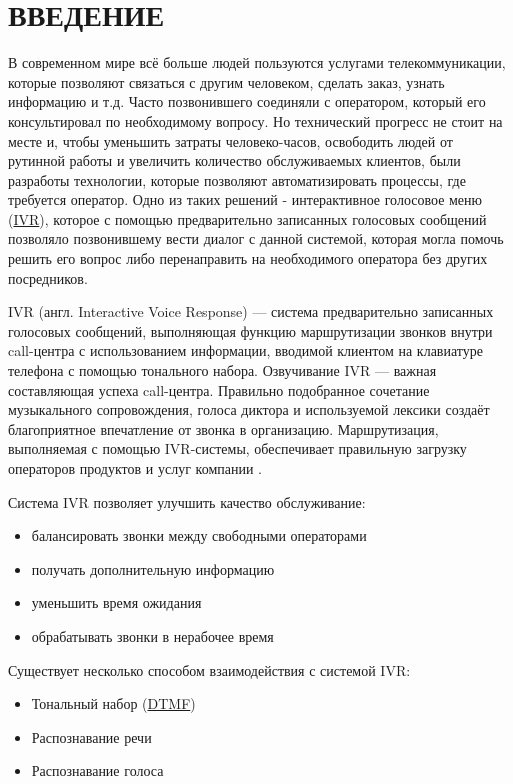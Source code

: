 \chapter{ВВЕДЕНИЕ}

В современном мире всё больше людей пользуются услугами телекоммуникации, которые
позволяют связаться с другим человеком, сделать заказ, узнать информацию и т.д.
Часто позвонившего соединяли с оператором, который его консультировал по необходимому
вопросу. Но технический прогресс не стоит на месте и, чтобы уменьшить
затраты человеко-часов, освободить людей от рутинной работы и увеличить
количество обслуживаемых клиентов, были разработы технологии, которые позволяют
автоматизировать процессы, где требуется оператор. Одно из таких решений - 
интерактивное голосовое меню (\hyperlink{ivr}{IVR}), которое с помощью предварительно записанных голосовых
сообщений позволяло позвонившему вести диалог с данной системой, которая могла
помочь решить его вопрос либо перенаправить на необходимого оператора без других
посредников.

IVR (англ. Interactive Voice Response) — система предварительно записанных
голосовых сообщений, выполняющая функцию маршрутизации звонков внутри call-центра
с использованием информации, вводимой клиентом на клавиатуре телефона с помощью
тонального набора. Озвучивание IVR — важная составляющая успеха call-центра.
Правильно подобранное сочетание музыкального сопровождения, голоса диктора и
используемой лексики создаёт благоприятное впечатление от звонка в организацию.
Маршрутизация, выполняемая с помощью IVR-системы, обеспечивает правильную загрузку
операторов продуктов и услуг компании \cite{ivr}.

Система IVR позволяет улучшить качество обслуживание:
\begin{itemize}
    \item балансировать звонки между свободными операторами
    \item получать дополнительную информацию
    \item уменьшить время ожидания
    \item обрабатывать звонки в нерабочее время
\end{itemize}

Существует несколько способом взаимодействия с системой IVR:
\begin{itemize}
    \item Тональный набор (\hyperlink{dtmf}{DTMF})
    \item Распознавание речи
    \item Распознавание голоса
\end{itemize}

